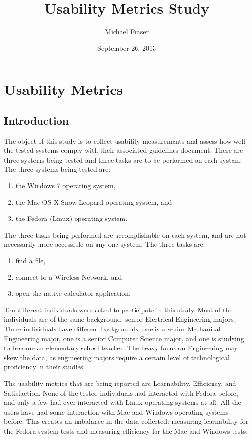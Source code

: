 \documentclass[11pt,letterpaper]{report}
\begin{document}
\title{Usability Metrics Study}
\author{Michael Fraser}
\date{September 26, 2013}
\maketitle

\tableofcontents
\listoftables

\chapter{Usability Metrics}
\section{Introduction}
The object of this study is to collect usability measurements and assess how well the tested systems comply with their associated guidelines document. There are three systems being tested and three tasks are to be performed on each system. The three systems being tested are:
\begin{enumerate}
\item the Windows 7 operating system, 
\item the Mac OS X Snow Leopard operating system, and
\item the Fedora (Linux) operating system. 
\end{enumerate}

The three tasks being performed are accomplishable on each system, and are not necessarily more accessible on any one system. The three tasks are:
\begin{enumerate}
\item find a file,
\item connect to a Wireless Network, and
\item open the native calculator application.
\end{enumerate}

Ten different individuals were asked to participate in this study. Most of the individuals are of the same background: senior Electrical Engineering majors. Three individuals have different backgrounds: one is a senior Mechanical Engineering major, one is a senior Computer Science major, and one is studying to become an elementary school teacher. The heavy focus on Engineering may skew the data, as engineering majors require a certain level of technological proficiency in their studies.

The usability metrics that are being reported are Learnability, Efficiency, and Satisfaction. None of the tested individuals had interacted with Fedora before, and only a few had ever interacted with Linux operating systems at all. All the users have had some interaction with Mac and Windows operating systems before. This creates an imbalance in the data collected: measuring learnability for the Fedora system tests and measuring efficiency for the Mac and Windows tests. 
\end{document}

